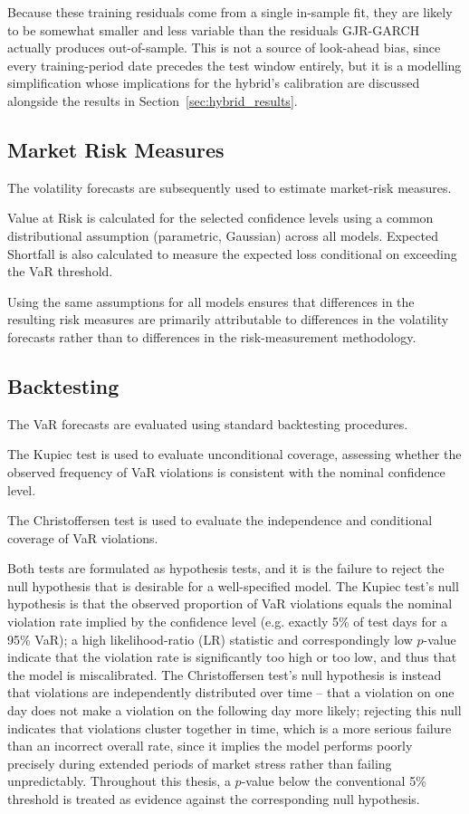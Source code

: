 \documentclass[12pt,a4paper]{article}
\begin{document}
Because these training residuals come from a single in-sample fit, they are likely to be somewhat
smaller and less variable than the residuals GJR-GARCH actually produces out-of-sample. This is not
a source of look-ahead bias, since every training-period date precedes the test window entirely, but
it is a modelling simplification whose implications for the hybrid's calibration are discussed
alongside the results in Section~\ref{sec:hybrid_results}.

\subsection{Market Risk Measures}\label{sec:market_risk}

The volatility forecasts are subsequently used to estimate market-risk measures.

Value at Risk is calculated for the selected confidence levels using a common distributional
assumption (parametric, Gaussian) across all models. Expected Shortfall is also calculated to
measure the expected loss conditional on exceeding the VaR threshold.

Using the same assumptions for all models ensures that differences in the resulting risk measures
are primarily attributable to differences in the volatility forecasts rather than to differences in
the risk-measurement methodology.

\subsection{Backtesting}\label{sec:backtesting}

The VaR forecasts are evaluated using standard backtesting procedures.

The Kupiec test is used to evaluate unconditional coverage, assessing whether the observed
frequency of VaR violations is consistent with the nominal confidence level.

The Christoffersen test is used to evaluate the independence and conditional coverage of VaR
violations.

Both tests are formulated as hypothesis tests, and it is the failure to reject the null hypothesis
that is desirable for a well-specified model. The Kupiec test's null hypothesis is that the observed
proportion of VaR violations equals the nominal violation rate implied by the confidence level (e.g.
exactly 5\% of test days for a 95\% VaR); a high likelihood-ratio (LR) statistic and correspondingly
low $p$-value indicate that the violation rate is significantly too high or too low, and thus that
the model is miscalibrated. The Christoffersen test's null hypothesis is instead that violations are
independently distributed over time -- that a violation on one day does not make a violation on the
following day more likely; rejecting this null indicates that violations cluster together in time,
which is a more serious failure than an incorrect overall rate, since it implies the model performs
poorly precisely during extended periods of market stress rather than failing unpredictably.
Throughout this thesis, a $p$-value below the conventional 5\% threshold is treated as evidence
against the corresponding null hypothesis.
\end{document}
